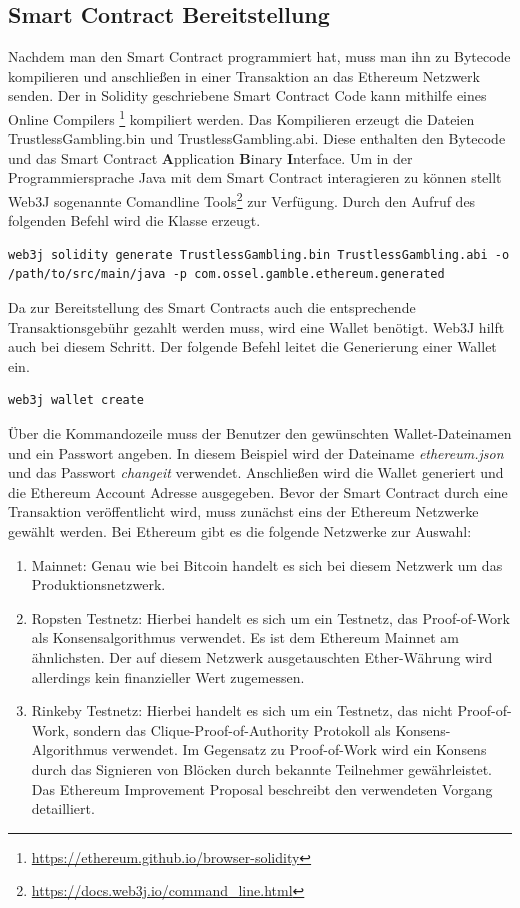 \subsection{Smart Contract Bereitstellung}
Nachdem man den Smart Contract programmiert hat, muss man ihn zu Bytecode kompilieren und anschließen in einer Transaktion an das Ethereum Netzwerk senden. Der in Solidity geschriebene Smart Contract Code kann mithilfe eines Online Compilers \footnote{\url{https://ethereum.github.io/browser-solidity}} kompiliert werden. Das Kompilieren erzeugt die Dateien {TrustlessGambling.bin} und {TrustlessGambling.abi}. Diese enthalten den Bytecode und das Smart Contract \textbf{A}pplication \textbf{B}inary \textbf{I}nterface.
Um in der Programmiersprache Java mit dem Smart Contract interagieren zu können stellt Web3J sogenannte Comandline Tools\footnote{\url{https://docs.web3j.io/command_line.html}} zur Verfügung. Durch den Aufruf des folgenden Befehl wird die Klasse  erzeugt. 
\begin{lstlisting}[basicstyle=\small]
web3j solidity generate TrustlessGambling.bin TrustlessGambling.abi -o /path/to/src/main/java -p com.ossel.gamble.ethereum.generated
\end{lstlisting}
Da zur Bereitstellung des Smart Contracts auch die entsprechende Transaktionsgebühr gezahlt werden muss, wird eine Wallet benötigt. Web3J hilft auch bei diesem Schritt. Der folgende Befehl leitet die Generierung einer Wallet ein.
\begin{lstlisting}[basicstyle=\small]
web3j wallet create
\end{lstlisting}
Über die Kommandozeile muss der Benutzer den gewünschten Wallet-Dateinamen  und ein Passwort angeben. In diesem Beispiel wird der Dateiname \textit{ethereum.json} und das Passwort \textit{changeit} verwendet. Anschließen wird die Wallet generiert und die Ethereum Account Adresse ausgegeben.
Bevor der Smart Contract durch eine Transaktion veröffentlicht wird, muss zunächst eins der Ethereum Netzwerke gewählt werden. Bei Ethereum gibt es die folgende Netzwerke zur Auswahl:
\begin{enumerate}
\item Mainnet: Genau wie bei Bitcoin handelt es sich bei diesem Netzwerk um das Produktionsnetzwerk. 
\item Ropsten Testnetz: Hierbei handelt es sich um ein Testnetz, das Proof-of-Work als Konsensalgorithmus verwendet. Es ist dem Ethereum Mainnet am ähnlichsten. Der auf diesem Netzwerk ausgetauschten Ether-Währung wird allerdings kein finanzieller Wert zugemessen.
\item Rinkeby Testnetz: Hierbei handelt es sich um ein Testnetz, das nicht Proof-of-Work, sondern das Clique-Proof-of-Authority Protokoll als Konsens-Algorithmus verwendet. Im Gegensatz zu Proof-of-Work wird ein Konsens durch das Signieren von Blöcken durch bekannte Teilnehmer gewährleistet. Das Ethereum Improvement Proposal \cite{eip_rinkeby} beschreibt den verwendeten Vorgang detailliert.
\end{enumerate}
